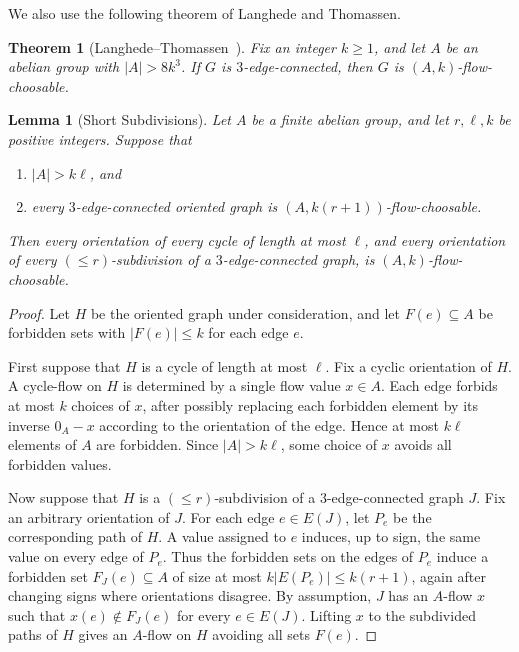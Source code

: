 \documentclass[a4paper,12pt]{article}
\theoremstyle{plain}
\newtheorem{thmA}{Theorem}
\newtheorem{lem}[theorem]{Lemma}
\theoremstyle{definition}
\renewcommand\le\leqslant
\renewcommand\ge\geqslant
\begin{document}
We also use the following theorem of Langhede and Thomassen.

\begin{thmA}[Langhede--Thomassen~{\cite[Corollary 16]{LT}}]
    \label{LT-lem}
    Fix an integer $k\ge 1$, and let $A$ be an abelian group with $|A|>8k^3$.  If $G$ is $3$-edge-connected, then $G$ is $(A,k)$-flow-choosable.
\end{thmA}

\begin{lem}[Short Subdivisions]
    \label{local-subdivision-choosability-lem}
    Let $A$ be a finite abelian group, and let $r,\ell,k$ be positive integers.  Suppose that
    \begin{enumerate}[label=\textup{(\roman*)}]
        \item $|A|>k\ell$, and
        \item every $3$-edge-connected oriented graph is $(A,k(r+1))$-flow-choosable.
    \end{enumerate}
    Then every orientation of every cycle of length at most $\ell$, and every orientation of every $(\le r)$-subdivision of a $3$-edge-connected graph, is $(A,k)$-flow-choosable.
\end{lem}
\begin{proof}
    Let $H$ be the oriented graph under consideration, and let $F(e)\subseteq A$ be forbidden sets with $|F(e)|\le k$ for each edge $e$.

    First suppose that $H$ is a cycle of length at most $\ell$.  Fix a cyclic orientation of $H$.  A cycle-flow on $H$ is determined by a single flow value $x\in A$.  Each edge forbids at most $k$ choices of $x$, after possibly replacing each forbidden element by its inverse $0_A-x$ according to the orientation of the edge.  Hence at most $k\ell$ elements of $A$ are forbidden.  Since $|A|>k\ell$, some choice of $x$ avoids all forbidden values.

    Now suppose that $H$ is a $(\le r)$-subdivision of a $3$-edge-connected graph $J$.  Fix an arbitrary orientation of $J$.  For each edge $e\in E(J)$, let $P_e$ be the corresponding path of $H$.  A value assigned to $e$ induces, up to sign, the same value on every edge of $P_e$.  Thus the forbidden sets on the edges of $P_e$ induce a forbidden set $F_J(e)\subseteq A$ of size at most $k|E(P_e)|\le k(r+1)$, again after changing signs where orientations disagree.  By assumption, $J$ has an $A$-flow $x$ such that $x(e)\notin F_J(e)$ for every $e\in E(J)$.  Lifting $x$ to the subdivided paths of $H$ gives an $A$-flow on $H$ avoiding all sets $F(e)$.
\end{proof}
\end{document}
